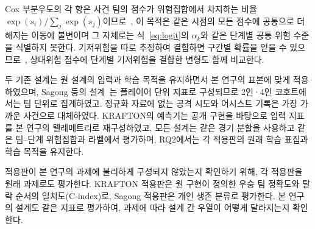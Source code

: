 Cox 부분우도의 각 항은 사건 팀의 점수가 위험집합에서 차지하는 비율 $\exp(s_i)/\sum_{j}\exp(s_j)$이므로~\cite{Cox72}, 이 목적은 같은 시점의 모든 점수에 공통으로 더해지는 이동에 불변이며 그 자체로는 식~\eqref{eq:logit}의 $\alpha_k$와 같은 단계별 공통 위험 수준을 식별하지 못한다.
기저위험을 따로 추정하여 결합하면 구간별 확률을 얻을 수 있으므로~\cite{PrenticeGloeckler78}, 상대위험 점수에 단계별 기저위험을 결합한 변형도 함께 비교한다.

두 기존 설계는 원 설계의 입력과 학습 목적을 유지하면서 본 연구의 표본에 맞게 적용하였으며, 
Sagong 등의 설계~\cite{Sagong25a}는 플레이어 단위 지표로 구성되므로 2인·4인 코호트에서는 팀 단위로 집계하였고.
정규화 자료에 없는 공격 시도와 어시스트 기록은 가장 가까운 사건으로 대체하였다.
KRAFTON의 예측기는 공개 구현을 바탕으로 입력 지표를 본 연구의 텔레메트리로 재구성하였고, 
모든 설계는 같은 경기 분할을 사용하고 같은 팀--단계 위험집합과 라벨에서 평가하며, RQ2에서는 각 적용판의 원래 학습 표집과 학습 목적을 유지한다.

적용판이 본 연구의 과제에 불리하게 구성되지 않았는지 확인하기 위해, 각 적용판을 원래 과제로도 평가한다.
KRAFTON 적용판은 원 구현이 정의한 우승 팀 정확도와 탈락 순서의 일치도(C-index)로, Sagong 적용판은  개인 생존 분류로 평가한다.
본 연구의 설계도 같은 지표로 평가하여, 과제에 따라 설계 간 우열이 어떻게 달라지는지 확인한다.


